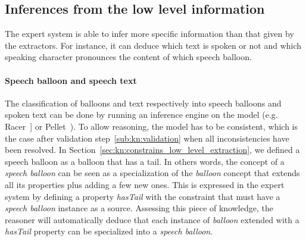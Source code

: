 \subsection{Inferences from the low level information} %
\label{sub:inference_from_low_level}

The expert system is able to infer more specific information than that given by the extractors.
For instance, it can deduce which text is spoken or not and which speaking character pronounces the content of which speech balloon.






\paragraph{Speech balloon and speech text} %
\label{par:speech_balloon_and_speech_text}

The classification of balloons and text respectively into speech balloons and spoken text can be done by running an inference engine on the model (e.g. Racer~\cite{Haarslev2012}] or Pellet~\cite{Sirin2007a}).
To allow reasoning, the model has to be consistent, which is the case after validation step~\ref{sub:kn:validation} when all inconsistencies have been resolved.
In Section~\ref{sec:kn:constrains_low_level_extraction}, we defined a speech balloon as a balloon that has a tail.
In others words, the concept of a \textit{speech balloon} can be seen as a specialization of the \textit{balloon} concept that extends all its properties plus adding a few new ones.
This is expressed in the expert system by defining a property \textit{hasTail} with the constraint that must have a \textit{speech balloon} instance as a source.
Assessing this piece of knowledge, the reasoner will automatically deduce that each instance of \textit{balloon} extended with a \textit{hasTail} property can be specialized into a \textit{speech balloon}.

